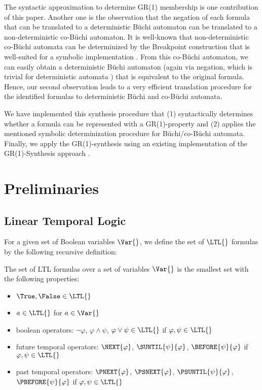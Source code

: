 \documentclass[submission,copyright,creativecommons]{eptcs}
\begin{document}
The syntactic approximation to determine GR(1) membership is one contribution of this paper. Another one is the observation that the negation of each formula that can be translated to a deterministic Büchi automaton can be translated to a non-deterministic co-Büchi automaton. It is well-known that non-deterministic co-Büchi automata can be determinized by the Breakpoint construction \cite{MiHa84} that is well-suited for a symbolic implementation \cite{MoSL08,BoKu09a}. From this co-Büchi automaton, we can easily obtain a deterministic Büchi automaton (again via negation, which is trivial for deterministic automata \cite{Schn03}) that is equivalent to the original formula. Hence, our second observation leads to a very efficient translation procedure for the identified \LTL{} formulas to deterministic Büchi and co-Büchi automata.

We have implemented this synthesis procedure that (1) syntactically determines whether a formula can be represented with a GR(1)-property and (2) applies the mentioned symbolic determinization procedure for Büchi/co-Büchi automata. Finally, we apply the GR(1)-synthesis using an existing implementation of the GR(1)-Synthesis approach \cite{BCGH10a}.

\section{Preliminaries}

\subsection{\texorpdfstring{Linear Temporal Logic \LTL{}}{Linear Temporal Logic LTL}}
For a given set of Boolean variables $\Var{}$, we define the set of $\LTL{}$ formulas by the following recursive definition:
\begin{definition}
The set of  LTL formulas over a set of variables $\Var{}$ is the smallest set with the following properties:
\begin{itemize} \setlength{\itemsep}{-1mm}
\item $\True, \False \in \LTL{}$ 
\item $a \in\LTL{}$ for $a \in \Var{}$
\item boolean operators: $\neg \varphi$, $\varphi \wedge \psi$, $\varphi \vee \psi\in \LTL{}$ if $\varphi,\psi \in \LTL{}$
\item future temporal operators: $\NEXT{\varphi}$, $\SUNTIL{\psi}{\varphi}$, $\BEFORE{\psi}{\varphi}$  if $\varphi,\psi \in \LTL{}$
\item past temporal operators: $\PNEXT{\varphi}$, $\PSNEXT{\varphi}$, $\PSUNTIL{\psi}{\varphi}$, $\PBEFORE{\psi}{\varphi}$  if $\varphi,\psi \in \LTL{}$	
\end{itemize}
\end{definition}
\end{document}
